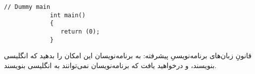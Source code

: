 \begin{LTR}
\begin{lstlisting}[style=C++Style]
             // Dummy main
             int main()
             {
             	return (0);
             }
        \end{lstlisting}
\end{LTR}

\begin{tcolorbox}
    قانونِ زبان‌های برنامه‌نویسیِ پیشرفته: به برنامه‌نویسان این امکان را بدهید که انگلیسی بنویسند، و درخواهید یافت که برنامه‌نویسان نمی‌توانند به انگلیسی بنویسند.
\end{tcolorbox}